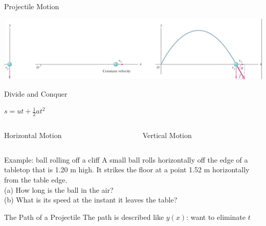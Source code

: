 \begin{frame}{Projectile Motion}

\includegraphics[scale=0.32]{proj5}

\end{frame}

\begin{frame}{Divide and Conquer}
\begin{center}
$s= ut + \frac{1}{2} at^2$ 
\end{center}



\begin{columns}
\begin{column}{0.5\textwidth}
\begin{center}
Horizontal Motion
\end{center}
\vspace{12cm}

\end{column}
\begin{column}{0.5\textwidth}
\begin{center}
Vertical Motion
\end{center}
\vspace{12cm}

\end{column}
\end{columns}
\end{frame}


\begin{frame}{Example: ball rolling off a cliff}
\small
A small ball rolls horizontally off the edge of a tabletop that is 1.20 m high. It strikes the floor at a point 1.52 m horizontally from the table edge.\\
 (a) How long is the ball in the air? \\
 (b) What is its speed at the instant it leaves the table?\\
\vspace{10cm}

\end{frame}


\begin{frame}{The Path of a Projectile}
The path is described like $y(x)$: want to eliminate $t$\\
\vspace{12cm}


\end{frame}

